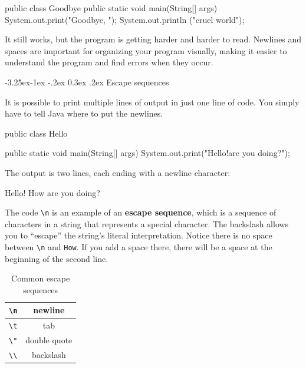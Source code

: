 \documentclass[12pt]{book}
\makeatletter
\renewcommand\subsection{\@startsection{subsection}{2}{\z@}%
    {-3.25ex\@plus -1ex \@minus -.2ex}%
    {0.3ex \@plus .2ex}%
    {\normalfont\large\bfseries}}
\theoremstyle{exercise}
\makeatother
\begin{document}
\begin{code}
public class Goodbye { public static void main(String[] args) {
System.out.print("Goodbye, "); System.out.println
("cruel world");}}
\end{code}

It still works, but the program is getting harder and harder to read.
Newlines and spaces are important for organizing your program visually, making it easier to understand the program and find errors when they occur.

\subsection{Escape sequences}

It is possible to print multiple lines of output in just one line of code.
You simply have to tell Java where to put the newlines.

\begin{code}
public class Hello {

    public static void main(String[] args) {
        System.out.print("Hello!\nHow are you doing?\n");
    }

}
\end{code}

The output is two lines, each ending with a newline character:

\begin{stdout}
Hello!
How are you doing?
\end{stdout}


The code \verb"\n" is an example of an {\bf escape sequence}, which is a sequence of characters in a string that represents a special character.
The backslash allows you to ``escape'' the string's literal interpretation.
Notice there is no space between \verb"\n" and \verb"How".
If you add a space there, there will be a space at the beginning of the second line.

\begin{table}[!h]
\begin{center}
\begin{tabular}{|c|c|}
\hline
\verb"\n" & newline \\
\hline
\verb"\t" & tab \\
\hline
\verb'\"' & double quote \\
\hline
\verb"\\" & backslash \\
\hline
\end{tabular}
\caption{Common escape sequences}
\end{center}
\end{table}
\end{document}
